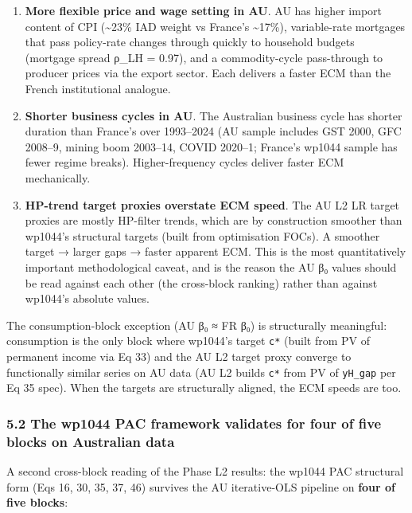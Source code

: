 \documentclass[
]{article}
\providecommand{\tightlist}{%
  \setlength{\itemsep}{0pt}\setlength{\parskip}{0pt}}
\begin{document}
\begin{enumerate}
\def\labelenumi{\arabic{enumi}.}
\tightlist
\item
  \textbf{More flexible price and wage setting in AU}. AU has higher
  import content of CPI (\textasciitilde23\% IAD weight vs France's
  \textasciitilde17\%), variable-rate mortgages that pass policy-rate
  changes through quickly to household budgets (mortgage spread ρ\_LH =
  0.97), and a commodity-cycle pass-through to producer prices via the
  export sector. Each delivers a faster ECM than the French
  institutional analogue.
\item
  \textbf{Shorter business cycles in AU}. The Australian business cycle
  has shorter duration than France's over 1993--2024 (AU sample includes
  GST 2000, GFC 2008--9, mining boom 2003--14, COVID 2020--1; France's
  wp1044 sample has fewer regime breaks). Higher-frequency cycles
  deliver faster ECM mechanically.
\item
  \textbf{HP-trend target proxies overstate ECM speed}. The AU L2 LR
  target proxies are mostly HP-filter trends, which are by construction
  smoother than wp1044's structural targets (built from optimisation
  FOCs). A smoother target → larger gaps → faster apparent ECM. This is
  the most quantitatively important methodological caveat, and is the
  reason the AU β₀ values should be read against each other (the
  cross-block ranking) rather than against wp1044's absolute values.
\end{enumerate}

The consumption-block exception (AU β₀ ≈ FR β₀) is structurally
meaningful: consumption is the only block where wp1044's target
\texttt{c*} (built from PV of permanent income via Eq 33) and the AU L2
target proxy converge to functionally similar series on AU data (AU L2
builds \texttt{c*} from PV of \texttt{yH\_gap} per Eq 35 spec). When the
targets are structurally aligned, the ECM speeds are too.

\subsubsection{5.2 The wp1044 PAC framework validates for four of five
blocks on Australian
data}\label{the-wp1044-pac-framework-validates-for-four-of-five-blocks-on-australian-data}

A second cross-block reading of the Phase L2 results: the wp1044 PAC
structural form (Eqs 16, 30, 35, 37, 46) survives the AU iterative-OLS
pipeline on \textbf{four of five blocks}:
\end{document}
